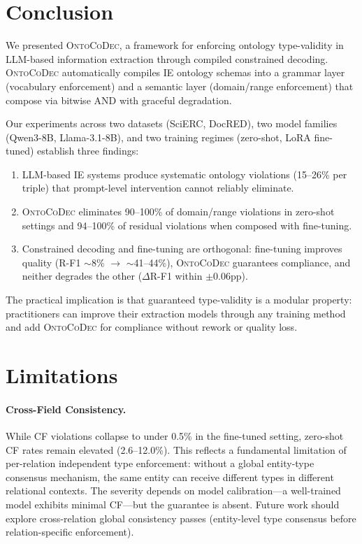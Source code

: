 \documentclass[11pt,a4paper]{article}
\newcommand{\sys}{\textsc{OntoCoDec}}
\begin{document}
\section{Conclusion}
\label{sec:conclusion}

We presented \sys{}, a framework for enforcing ontology type-validity in LLM-based information extraction through compiled constrained decoding. \sys{} automatically compiles IE ontology schemas into a grammar layer (vocabulary enforcement) and a semantic layer (domain/range enforcement) that compose via bitwise AND with graceful degradation.

Our experiments across two datasets (SciERC, DocRED), two model families (Qwen3-8B, Llama-3.1-8B), and two training regimes (zero-shot, LoRA fine-tuned) establish three findings:
\begin{enumerate}[nosep,leftmargin=*]
    \item LLM-based IE systems produce systematic ontology violations (15--26\% per triple) that prompt-level intervention cannot reliably eliminate.
    \item \sys{} eliminates 90--100\% of domain/range violations in zero-shot settings and 94--100\% of residual violations when composed with fine-tuning.
    \item Constrained decoding and fine-tuning are orthogonal: fine-tuning improves quality (R-F1 $\sim$8\% $\to$ $\sim$41--44\%), \sys{} guarantees compliance, and neither degrades the other ($\Delta$R-F1 within $\pm$0.06pp).
\end{enumerate}
The practical implication is that guaranteed type-validity is a modular property: practitioners can improve their extraction models through any training method and add \sys{} for compliance without rework or quality loss.

\section*{Limitations}

\paragraph{Cross-Field Consistency.}
While CF violations collapse to under 0.5\% in the fine-tuned setting, zero-shot CF rates remain elevated (2.6--12.0\%). This reflects a fundamental limitation of per-relation independent type enforcement: without a global entity-type consensus mechanism, the same entity can receive different types in different relational contexts. The severity depends on model calibration---a well-trained model exhibits minimal CF---but the guarantee is absent.  Future work should explore cross-relation global consistency passes (entity-level type consensus before relation-specific enforcement).
\end{document}
